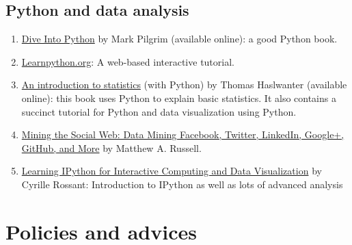 \documentclass[11pt,article,oneside]{memoir} %
\begin{document}
\subsection{Python and data analysis} %

\begin{enumerate}

\item \href{http://www.diveintopython3.net/index.html}{Dive Into Python} by Mark Pilgrim (available online): a good Python book.

\item \href{http://www.learnpython.org}{Learnpython.org}: A web-based interactive tutorial.

\item \href{http://work.thaslwanter.at/Stats/html/}{An introduction to statistics} (with Python) by Thomas Haslwanter (available online): this book uses Python to explain basic statistics. It also contains a succinct tutorial for Python and data visualization using Python.

\item \href{https://www.amazon.com/Mining-Social-Web-Facebook-LinkedIn/dp/1449367615}{Mining the Social Web: Data Mining Facebook, Twitter, LinkedIn, Google+, GitHub, and More} by Matthew A. Russell.

\item \href{http://ipython.rossant.net}{Learning IPython for Interactive Computing and Data Visualization} by  Cyrille Rossant: Introduction to IPython as well as lots of advanced analysis


\end{enumerate} %

\section{Policies and advices} %
\end{document}
